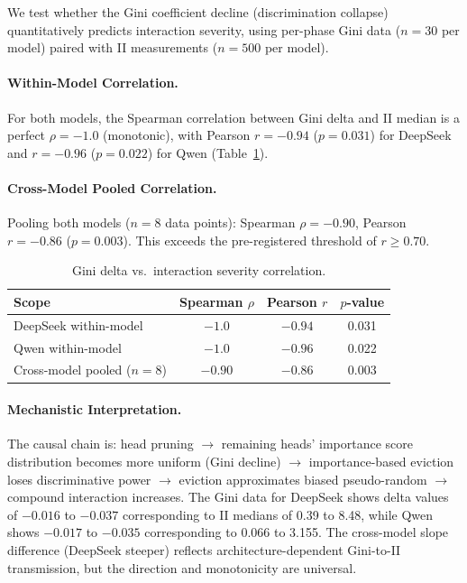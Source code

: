 \documentclass[11pt]{article}
\begin{document}
We test whether the Gini coefficient decline (discrimination collapse) quantitatively predicts interaction severity, using per-phase Gini data ($n=30$ per model) paired with II measurements ($n=500$ per model).

\paragraph{Within-Model Correlation.}
For both models, the Spearman correlation between Gini delta and II median is a perfect $\rho=-1.0$ (monotonic), with Pearson $r=-0.94$ ($p=0.031$) for DeepSeek and $r=-0.96$ ($p=0.022$) for Qwen (Table~\ref{tab:gini_corr}).

\paragraph{Cross-Model Pooled Correlation.}
Pooling both models ($n=8$ data points): Spearman $\rho=-0.90$, Pearson $r=-0.86$ ($p=0.003$). This exceeds the pre-registered threshold of $r\geq0.70$.

\begin{table}[h]
\centering
\caption{Gini delta vs.\ interaction severity correlation.}
\label{tab:gini_corr}
\begin{tabular}{lccc}
\toprule
Scope & Spearman $\rho$ & Pearson $r$ & $p$-value \\
\midrule
DeepSeek within-model & $-1.0$ & $-0.94$ & 0.031 \\
Qwen within-model & $-1.0$ & $-0.96$ & 0.022 \\
Cross-model pooled ($n=8$) & $-0.90$ & $-0.86$ & 0.003 \\
\bottomrule
\end{tabular}
\end{table}

\paragraph{Mechanistic Interpretation.}
The causal chain is: head pruning $\to$ remaining heads' importance score distribution becomes more uniform (Gini decline) $\to$ importance-based eviction loses discriminative power $\to$ eviction approximates biased pseudo-random $\to$ compound interaction increases. The Gini data for DeepSeek shows delta values of $-0.016$ to $-0.037$ corresponding to II medians of 0.39 to 8.48, while Qwen shows $-0.017$ to $-0.035$ corresponding to 0.066 to 3.155. The cross-model slope difference (DeepSeek steeper) reflects architecture-dependent Gini-to-II transmission, but the direction and monotonicity are universal.
\end{document}
